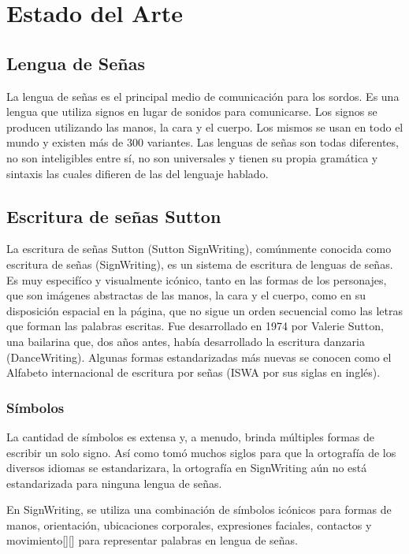 \chapter{Estado del Arte}\label{chapter:state-of-the-art}

\section{Lengua de Señas}\label{section:state-of-the-art:sl}
La lengua de señas es el principal medio de comunicación para los sordos. Es una lengua que utiliza signos en lugar de sonidos para comunicarse. Los signos se producen utilizando las manos, la cara y el cuerpo. Los mismos se usan en todo el mundo y existen más de 300 variantes.
Las lenguas de señas son todas diferentes, no son inteligibles entre sí, no son universales y tienen su propia gramática y sintaxis las cuales difieren de las del lenguaje hablado.

\section{Escritura de señas Sutton}\label{section:state-of-the-art:sw}
La escritura de señas Sutton (Sutton SignWriting), comúnmente conocida como escritura de señas (SignWriting), es un sistema de escritura de lenguas de señas. Es muy especifíco y visualmente icónico, tanto en las formas de los personajes, que son imágenes abstractas de las manos, la cara y el cuerpo, como en su disposición espacial en la página, que no sigue un orden secuencial como las letras que forman las palabras escritas. Fue desarrollado en 1974 por Valerie Sutton, una bailarina que, dos años antes, había desarrollado la escritura danzaria (DanceWriting). Algunas formas estandarizadas más nuevas se conocen como el Alfabeto internacional de escritura por señas (ISWA por sus siglas en inglés).

\subsection{Símbolos}\label{subsection:state-of-the-art:sl:symbols}
La cantidad de símbolos es extensa y, a menudo, brinda múltiples formas de escribir un solo signo. Así como tomó muchos siglos para que la ortografía de los diversos idiomas se estandarizara, la ortografía en SignWriting aún no está estandarizada para ninguna lengua de señas.

En SignWriting, se utiliza una combinación de símbolos icónicos para formas de manos, orientación, ubicaciones corporales, expresiones faciales, contactos y movimiento[\cite{thiessen2011signwriting}][\cite{suttonsignwriting}] para representar palabras en lengua de señas.

